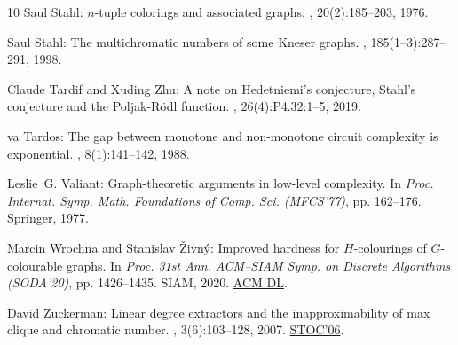 \documentclass[11pt]{article}
\numberwithin{equation}{section}
\theoremstyle{definition}
\theoremstyle{plain}
\begin{document}
\begin{thebibliography}{10}
{\sc Saul Stahl}: $n$-tuple colorings and associated graphs.
, 20(2):185--203, 1976.
\newblock [\epfmtdoi{10.1016/0095-8956(76)90010-1}]

{\sc Saul Stahl}: The multichromatic numbers of some {K}neser graphs.
, 185(1--3):287--291, 1998.
\newblock [\epfmtdoi{10.1016/S0012-365X(97)00211-2}]

{\sc Claude Tardif and Xuding Zhu}: A note on {H}edetniemi's conjecture,
  {S}tahl's conjecture and the {P}oljak-{R}{\"o}dl function.
, 26(4):P4.32:1--5, 2019.
\newblock [\epfmtdoi{10.37236/8787}]

{va Tardos}: The gap between monotone and non-monotone circuit
  complexity is exponential.
, 8(1):141--142, 1988.
\newblock [\epfmtdoi{10.1007/BF02122563}]

{\sc Leslie~G. Valiant}: Graph-theoretic arguments in low-level complexity.
\newblock In {\em Proc. Internat. Symp. Math. Foundations of Comp. Sci.
  (MFCS'77)}, pp. 162--176. Springer, 1977.
\newblock [\epfmtdoi{10.1007/3-540-08353-7\_135}]

{\sc Marcin Wrochna and Stanislav {\v Z}ivn{\' y}}: Improved hardness for
  ${H}$-colourings of ${G}$-colourable graphs.
\newblock In {\em Proc. 31st Ann. ACM--SIAM Symp. on Discrete Algorithms
  (SODA'20)}, pp. 1426--1435. SIAM, 2020.
\newblock \href{https://dl.acm.org/doi/abs/10.5555/3381089.3381175}{ACM DL}.

{\sc David Zuckerman}: Linear degree extractors and the inapproximability of
  max clique and chromatic number.
, 3(6):103--128, 2007.
\newblock \prelim \href{https:doi.org/10.1145/1132516.1132612}{STOC'06}.

\end{thebibliography}
\end{document}
